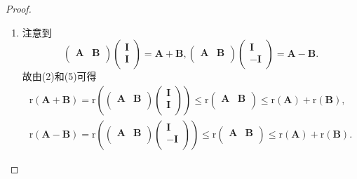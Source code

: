 \documentclass[lang=cn,newtx,10pt,scheme=chinese]{elegantbook}
\begin{document}
\begin{proof}
\begin{enumerate}[(1)]
\item  注意到
\[
\left( \begin{matrix}
\boldsymbol{A}&		\boldsymbol{B}\\
\end{matrix} \right) \left( \begin{array}{c}
\boldsymbol{I}\\
\boldsymbol{I}\\
\end{array} \right) =\boldsymbol{A}+\boldsymbol{B},\left( \begin{matrix}
\boldsymbol{A}&		\boldsymbol{B}\\
\end{matrix} \right) \left( \begin{array}{c}
\boldsymbol{I}\\
-\boldsymbol{I}\\
\end{array} \right) =\boldsymbol{A}-\boldsymbol{B}.
\]
故由(2)和(5)可得
\begin{align*}
\mathrm{r}\left( \boldsymbol{A}+\boldsymbol{B} \right) =\mathrm{r}\left( \left( \begin{matrix}
\boldsymbol{A}&		\boldsymbol{B}\\
\end{matrix} \right) \left( \begin{array}{c}
\boldsymbol{I}\\
\boldsymbol{I}\\
\end{array} \right) \right) \leqslant \mathrm{r}\left( \begin{matrix}
\boldsymbol{A}&		\boldsymbol{B}\\
\end{matrix} \right) \leqslant \mathrm{r}\left( \boldsymbol{A} \right) +\mathrm{r}\left( \boldsymbol{B} \right) ,
\\
\mathrm{r}\left( \boldsymbol{A}-\boldsymbol{B} \right) =\mathrm{r}\left( \left( \begin{matrix}
\boldsymbol{A}&		\boldsymbol{B}\\
\end{matrix} \right) \left( \begin{array}{c}
\boldsymbol{I}\\
-\boldsymbol{I}\\
\end{array} \right) \right) \leqslant \mathrm{r}\left( \begin{matrix}
\boldsymbol{A}&		\boldsymbol{B}\\
\end{matrix} \right) \leqslant \mathrm{r}\left( \boldsymbol{A} \right) +\mathrm{r}\left( \boldsymbol{B} \right) .
\end{align*}


\end{enumerate}
\end{proof}
\end{document}

